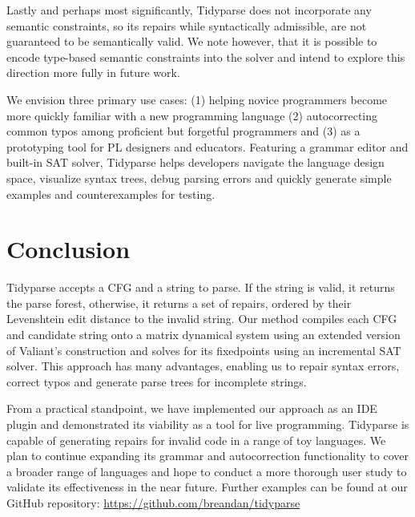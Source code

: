 \documentclass[sigplan,nonacm]{acmart}\settopmatter{printfolios=false,printccs=false,printacmref=false}
\begin{document}
Lastly and perhaps most significantly, Tidyparse does not incorporate any semantic constraints, so its repairs while syntactically admissible, are not guaranteed to be semantically valid. We note however, that it is possible to encode type-based semantic constraints into the solver and intend to explore this direction more fully in future work.

We envision three primary use cases: (1) helping novice programmers become more quickly familiar with a new programming language (2) autocorrecting common typos among proficient but forgetful programmers and (3) as a prototyping tool for PL designers and educators. Featuring a grammar editor and built-in SAT solver, Tidyparse helps developers navigate the language design space, visualize syntax trees, debug parsing errors and quickly generate simple examples and counterexamples for testing. %

\section{Conclusion}

Tidyparse accepts a CFG and a string to parse. If the string is valid, it returns the parse forest, otherwise, it returns a set of repairs, ordered by their Levenshtein edit distance to the invalid string. Our method compiles each CFG and candidate string onto a matrix dynamical system using an extended version of Valiant's construction and solves for its fixedpoints using an incremental SAT solver. This approach has many advantages, enabling us to repair syntax errors, correct typos and generate parse trees for incomplete strings.


From a practical standpoint, we have implemented our approach as an IDE plugin and demonstrated its viability as a tool for live programming. Tidyparse is capable of generating repairs for invalid code in a range of toy languages. We plan to continue expanding its grammar and autocorrection functionality to cover a broader range of languages and hope to conduct a more thorough user study to validate its effectiveness in the near future. Further examples can be found at our GitHub repository: \url{https://github.com/breandan/tidyparse}
\end{document}
